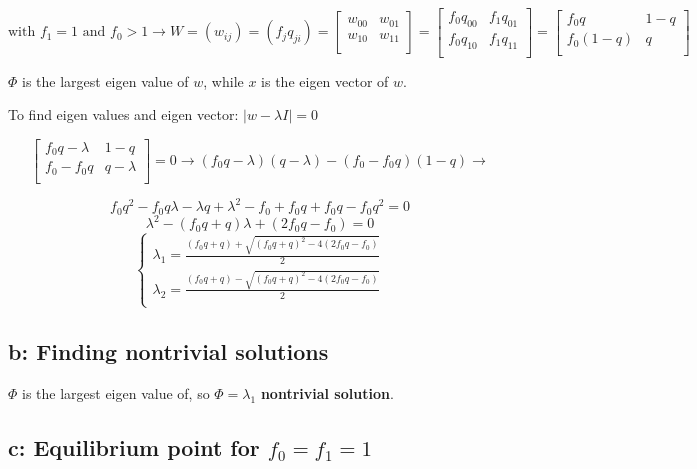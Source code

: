 \[ \text{with } f_1 = 1 \text{ and } f_0 > 1 \rightarrow W = (w_{ij}) = (f_jq_{ji}) = \begin{bmatrix}
       w_{00} & w_{01}\\[0.3em]
       w_{10} & w_{11} \\[0.3em]
     \end{bmatrix} = \begin{bmatrix}
            f_0q_{00} & f_1q_{01}\\[0.3em]
            f_0q_{10} & f_1q_{11} \\[0.3em]
          \end{bmatrix} = \begin{bmatrix}
                      f_0q & 1-q\\[0.3em]
                      f_0(1-q) & q \\[0.3em]
                    \end{bmatrix} \] 
 
$\varPhi$ is the largest eigen value of $w$, while $x$ is the eigen vector of $w$.

To find eigen values and eigen vector: $ |w - \lambda I | = 0 $ 

\[ \begin{bmatrix}
       f_0q-\lambda & 1-q\\[0.3em]
       f_0-f_0q & q-\lambda \\[0.3em]
     \end{bmatrix} = 0 \rightarrow (f_0q - \lambda)(q-\lambda)-(f_0-f_0q)(1-q)  \rightarrow \]
     
\[ f_0q^2 - f_0q\lambda -\lambda q+\lambda^2 - f_0 + f_0q + f_0q - f_0q^2 = 0 \]
\[ \lambda^2 - (f_0q+q)\lambda + (2f_0q-f_0) = 0 \]
\[ \left\{ \begin{array}{l}
         \lambda_1 = \frac{(f_0q+q) + \sqrt{(f_0q+q)^2 - 4(2f_0q-f_0)}}{2}\\
         \lambda_2 = \frac{(f_0q+q) - \sqrt{(f_0q+q)^2 - 4(2f_0q-f_0)}}{2}\\
       \end{array} \right. \] 

\subsection{b: Finding nontrivial solutions}

$\varPhi$ is the largest eigen value of, so $\varPhi = \lambda_1$ \textbf{nontrivial solution}.

\subsection{c: Equilibrium point for $f_0 = f_1 = 1$}

